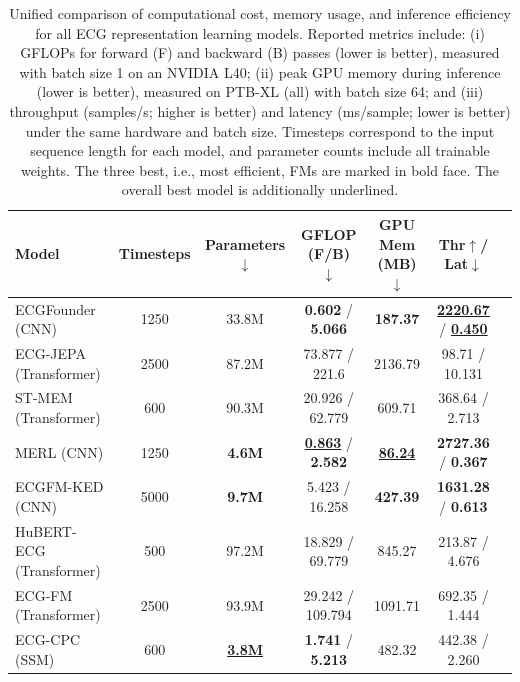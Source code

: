 \documentclass{article}
\begin{document}
        \begin{table}[htbp]
            \centering
            \scriptsize
            \caption{Unified comparison of computational cost, memory usage, and inference efficiency for all ECG representation learning models. Reported metrics include: (i) GFLOPs for forward (F) and backward (B) passes (lower is better), measured with batch size 1 on an NVIDIA L40; (ii) peak GPU memory during inference (lower is better), measured on PTB-XL (all) with batch size 64; and (iii) throughput (samples/s; higher is better) and latency (ms/sample; lower is better) under the same hardware and batch size. Timesteps correspond to the input sequence length for each model, and parameter counts include all trainable weights. The three best, i.e., most efficient, FMs are marked in bold face. The overall best model is additionally underlined.}
            \begin{tabular}{lcccccc}
                \toprule
                \textbf{Model} & \textbf{Timesteps} & \textbf{Parameters} $\downarrow$ & \textbf{GFLOP (F/B)} $\downarrow$ & \textbf{GPU Mem (MB)} $\downarrow$ & \textbf{Thr}$\uparrow$/ \textbf{Lat}$\downarrow$ \\
                \midrule        
                ECGFounder (CNN) & 1250 & 33.8M & \textbf{0.602} / \textbf{5.066} & \textbf{187.37} & \underline{\textbf{2220.67}} / \underline{\textbf{0.450}} \\        
                ECG-JEPA (Transformer) & 2500 & 87.2M & 73.877 / 221.6 & 2136.79 & 98.71 / 10.131 \\        
                ST-MEM (Transformer) & 600 & 90.3M & 20.926 / 62.779 & 609.71 & 368.64 / 2.713 \\        
                MERL (CNN) & 1250 & \textbf{4.6M} & \underline{\textbf{0.863}} / \textbf{2.582} & \textbf{\underline{86.24}} & \textbf{2727.36} / \textbf{0.367} \\        
                ECGFM-KED (CNN) & 5000 & \textbf{9.7M} & 5.423 / 16.258 & \textbf{427.39} & \textbf{1631.28} / \textbf{0.613} \\        
                HuBERT-ECG (Transformer) & 500 & 97.2M & 18.829 / 69.779 & 845.27 & 213.87 / 4.676 \\        
                ECG-FM (Transformer) & 2500 & 93.9M & 29.242 / 109.794 & 1091.71 & 692.35 / 1.444 \\        
                ECG-CPC (SSM) & 600 & \underline{\textbf{3.8M}} & \textbf{1.741} / \textbf{5.213} & 482.32 & 442.38 / 2.260 \\
                \bottomrule
            \end{tabular}
            \label{tab:efficiency}
        \end{table}
        
\end{document}
